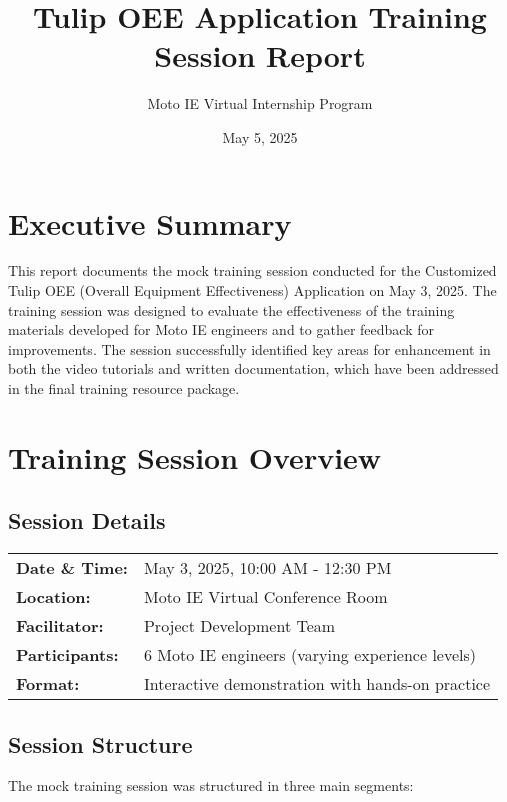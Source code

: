 \documentclass[12pt, letterpaper]{article}
\title{\textbf{Tulip OEE Application Training Session Report}}
\author{Moto IE Virtual Internship Program}
\date{May 5, 2025}
\begin{document}
\maketitle

\section*{Executive Summary}
This report documents the mock training session conducted for the Customized Tulip OEE (Overall Equipment Effectiveness) Application on May 3, 2025. The training session was designed to evaluate the effectiveness of the training materials developed for Moto IE engineers and to gather feedback for improvements. The session successfully identified key areas for enhancement in both the video tutorials and written documentation, which have been addressed in the final training resource package.

\section{Training Session Overview}

\subsection{Session Details}
\begin{tabular}{ll}
\textbf{Date \& Time:} & May 3, 2025, 10:00 AM - 12:30 PM \\
\textbf{Location:} & Moto IE Virtual Conference Room \\
\textbf{Facilitator:} & Project Development Team \\
\textbf{Participants:} & 6 Moto IE engineers (varying experience levels) \\
\textbf{Format:} & Interactive demonstration with hands-on practice \\
\end{tabular}

\subsection{Session Structure}
The mock training session was structured in three main segments:
\end{document}
